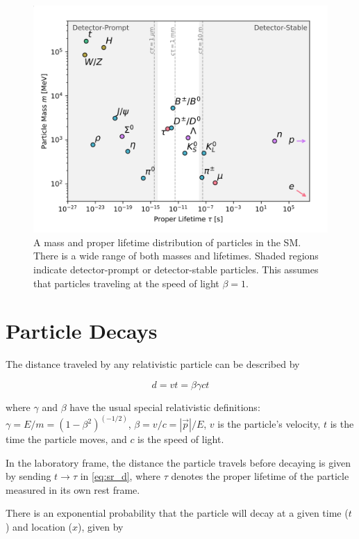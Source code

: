 \begin{figure}[htbp]
\centering
\includegraphics[width=.8\textwidth]{figures/theory/LLP-mass-lifetime.png}
\caption{A mass and proper lifetime distribution of particles in the \ac{SM}. There is a wide range of both masses and lifetimes. Shaded regions indicate detector-prompt or detector-stable particles. This assumes that particles traveling at the speed of light $\beta = 1$. \cite{llp-whitepaper}}
\label{fig:llp-mass-lifetime}
\end{figure}

\section{Particle Decays}

The distance traveled by any relativistic particle can be described by

\begin{equation}
d = vt = \beta \gamma c t
\label{eq:sr_d}
\end{equation}

where $\gamma$ and $\beta$ have the usual special relativistic definitions: $\gamma = E/m = (1-\beta^2)^(-1/2)$, $\beta = v/c = |\vec{p}|/E$, $v$ is the particle's velocity, $t$ is the time the particle moves, and $c$ is the speed of light. 

In the laboratory frame, the distance the particle travels before decaying is given by sending $t \rightarrow \tau$ in \autoref{eq:sr_d}, where $\tau$ denotes the proper lifetime of the particle measured in its own rest frame.

There is an exponential probability that the particle will decay at a given time ($t$) and location ($x$), given by 

